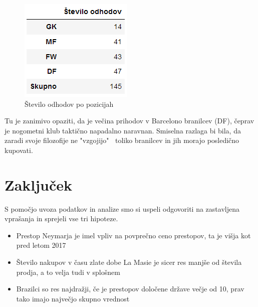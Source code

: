 \documentclass[a4paper, 12pt]{article}
\begin{document}
\begin{figure}[!htb]
\includegraphics[width=\linewidth]{tabela7}
\caption{Število odhodov po pozicijah}\label{fig:tabela7}
\endminipage\hfill
\end{figure}

Tu je zanimivo opaziti, da je večina prihodov v Barcelono branilcev (DF), čeprav je nogometni klub taktično napadalno naravnan. Smiselna razlaga bi bila, da zaradi svoje filozofije ne "vzgojijo" $\:$ toliko branilcev in jih morajo posledično kupovati.



\pagebreak

\section{Zaključek}
S pomočjo uvoza podatkov in analize smo si uspeli odgovoriti na zastavljena vprašanja in sprejeli vse tri hipoteze. 

\begin{itemize}
\item Prestop Neymarja je imel vpliv na povprečno ceno prestopov, ta je višja kot pred letom 2017
\item Število nakupov v času zlate dobe La Masie je sicer res manjše od števila prodja, a to velja tudi v splošnem
\item Brazilci so res najdražji, če je prestopov določene države večje od 10, prav tako imajo največjo skupno vrednost
\end{itemize}
\end{document}
